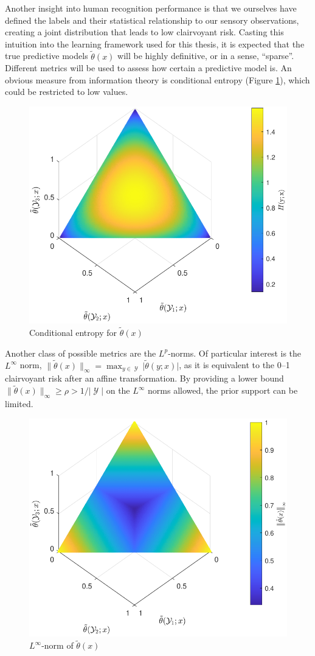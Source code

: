 \documentclass[12pt]{report}
\DeclareMathOperator{\Ycal}{\mathcal{Y}}
\begin{document}
Another insight into human recognition performance is that we ourselves have defined the labels and their statistical relationship to our sensory observations, creating a joint distribution that leads to low clairvoyant risk. Casting this intuition into the learning framework used for this thesis, it is expected that the true predictive models $\tilde{\theta}(x)$ will be highly definitive, or in a sense, ``sparse''. Different metrics will be used to assess how certain a predictive model is. An obvious measure from information theory is conditional entropy (Figure \ref{fig:theta_tilde_entropy}), which could be restricted to low values. 
\begin{figure}
\centering
\includegraphics[width=0.6\linewidth]{theta_tilde_entropy.pdf}
\caption{Conditional entropy for $\tilde{\theta}(x)$}
\label{fig:theta_tilde_entropy}
\end{figure}
Another class of possible metrics are the $L^p$-norms. Of particular interest is the $L^{\infty}$ norm, $\big\| \tilde{\theta}(x) \big\|_{\infty} = \max_{y \in \Ycal} \big| \tilde{\theta}(y;x) \big|$, as it is equivalent to the 0--1 clairvoyant risk after an affine transformation. By providing a lower bound $\big\| \tilde{\theta}(x) \big\|_{\infty} \geq \rho > 1/|\Ycal|$ on the $L^{\infty}$ norms allowed, the prior support can be limited.
\begin{figure}
\centering
\includegraphics[width=0.6\linewidth]{theta_tilde_Linf.pdf}
\caption{$L^{\infty}$-norm of $\tilde{\theta}(x)$}
\label{fig:theta_tilde_Linf}
\end{figure}
\end{document}
